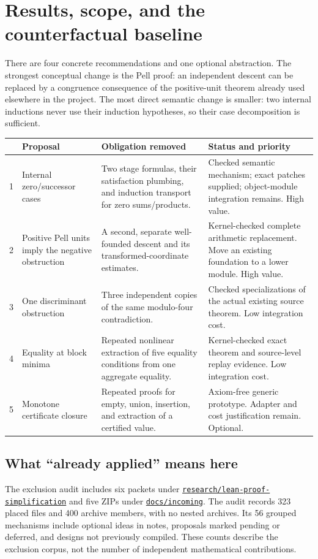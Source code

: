 \documentclass[11pt,letterpaper]{article}
\newcommand{\code}[1]{\nolinkurl{#1}}
\begin{document}
\section{Results, scope, and the counterfactual baseline}

There are four concrete recommendations and one optional abstraction. The strongest conceptual change is the Pell proof: an independent descent can be replaced by a congruence consequence of the positive-unit theorem already used elsewhere in the project. The most direct semantic change is smaller: two internal inductions never use their induction hypotheses, so their case decomposition is sufficient.

\begin{longtable}{P{0.045\textwidth}P{0.23\textwidth}P{0.34\textwidth}P{0.26\textwidth}}
\toprule
 & Proposal & Obligation removed & Status and priority\\
\midrule{} & Internal zero/successor cases & Two stage formulas, their satisfaction plumbing, and induction transport for zero sums/products. & Checked semantic mechanism; exact patches supplied; object-module integration remains. High value.\\
2 & Positive Pell units imply the negative obstruction & A second, separate well-founded descent and its transformed-coordinate estimates. & Kernel-checked complete arithmetic replacement. Move an existing foundation to a lower module. High value.\\
3 & One discriminant obstruction & Three independent copies of the same modulo-four contradiction. & Checked specializations of the actual existing source theorem. Low integration cost.\\
4 & Equality at block minima & Repeated nonlinear extraction of five equality conditions from one aggregate equality. & Kernel-checked exact theorem and source-level replay evidence. Low integration cost.\\
5 & Monotone certificate closure & Repeated proofs for empty, union, insertion, and extraction of a certified value. & Axiom-free generic prototype. Adapter and cost justification remain. Optional.\\
\bottomrule
\end{longtable}

\subsection{What ``already applied'' means here}

The exclusion audit includes six packets under \href{https://github.com/VladimirReshetnikov/ProveIt/tree/9bd29079d5e1c6cc1c0bcaee6cb57d59b835cba9/Computability/DiophantineConsistency/research/lean-proof-simplification}{\code{research/lean-proof-simplification}} and five ZIPs under \href{https://github.com/VladimirReshetnikov/ProveIt/tree/9bd29079d5e1c6cc1c0bcaee6cb57d59b835cba9/docs/incoming}{\code{docs/incoming}}. The audit records 323 placed files and 400 archive members, with no nested archives. Its 56 grouped mechanisms include optional ideas in notes, proposals marked pending or deferred, and designs not previously compiled. These counts describe the exclusion corpus, not the number of independent mathematical contributions.
\end{document}
